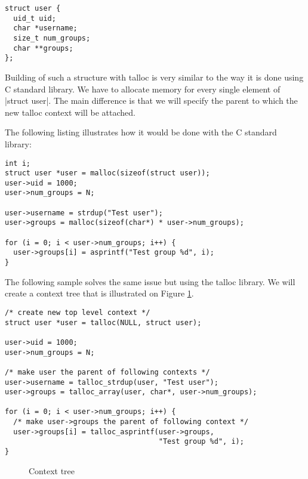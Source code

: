 \begin{lstlisting}[caption={struct user},label={struct-user}]
struct user {
  uid_t uid;
  char *username;
  size_t num_groups;
  char **groups;
};
\end{lstlisting}

\noindent
Building of such a structure with talloc is very similar to the way it is done
using C standard library. We have to allocate memory for every single element of
|struct user|. The main difference is that we will specify the parent to which
the new talloc context will be attached.

The following listing illustrates how it would be done with the C standard
library:

\begin{lstlisting}[caption={Building struct user -- C standard library}]
int i;
struct user *user = malloc(sizeof(struct user));
user->uid = 1000;
user->num_groups = N;

user->username = strdup("Test user");
user->groups = malloc(sizeof(char*) * user->num_groups);

for (i = 0; i < user->num_groups; i++) {
  user->groups[i] = asprintf("Test group %d", i);
}
\end{lstlisting}

\noindent
The following sample solves the same issue but using the talloc library. We will
create a context tree that is illustrated on Figure
\ref{fig:context-tree-1-user}.

\begin{lstlisting}[caption={Building struct user -- talloc library},
label={lst:context-tree-user},
morekeywords={talloc,talloc_strdup,talloc_array,talloc_asprintf}]
/* create new top level context */
struct user *user = talloc(NULL, struct user);

user->uid = 1000;
user->num_groups = N;

/* make user the parent of following contexts */
user->username = talloc_strdup(user, "Test user");
user->groups = talloc_array(user, char*, user->num_groups);

for (i = 0; i < user->num_groups; i++) {
  /* make user->groups the parent of following context */
  user->groups[i] = talloc_asprintf(user->groups,
                                    "Test group %d", i);
}
\end{lstlisting}

\begin{figure}[H]
  \centering
  
  \caption{Context tree}
  \label{fig:context-tree-1-user}
\end{figure}

